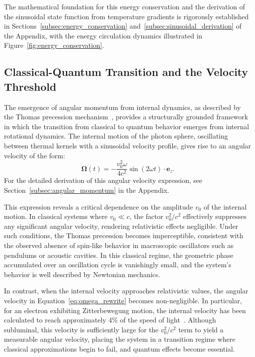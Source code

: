 \documentclass[%
 reprint,
 amsmath,amssymb,
 aps,
]{revtex4-1}
\numberwithin{equation}{section}%
\begin{document}
The mathematical foundation for this energy conservation and the derivation of the sinusoidal state function from temperature gradients is rigorously established in Sections~\ref{subsec:energy_conservation} and~\ref{subsec:sinusoidal_derivation} of the Appendix, with the energy circulation dynamics illustrated in Figure~\ref{fig:energy_conservation}.


\subsection{Classical-Quantum Transition and the Velocity Threshold} \label{subsec:velocity_threshold}

The emergence of angular momentum from internal dynamics, as described by the Thomas precession mechanism~\cite{hanamura2309.0047,hanamura2501.0130}, provides a structurally grounded framework in which the transition from classical to quantum behavior emerges from internal rotational dynamics. The internal motion of the photon sphere, oscillating between thermal kernels with a sinusoidal velocity profile, gives rise to an angular velocity of the form:
\begin{equation}
\boldsymbol{\Omega}(t) = -\frac{v_0^2 \omega}{4c^2} \sin(2\omega t) \cdot \boldsymbol{e}_z. \label{eq:omega_rewrite}
\end{equation}
For the detailed derivation of this angular velocity expression, see Section~\ref{subsec:angular_momentum} in the Appendix.

This expression reveals a critical dependence on the amplitude \( v_0 \) of the internal motion. In classical systems where \( v_0 \ll c \), the factor \( v_0^2/c^2 \) effectively suppresses any significant angular velocity, rendering relativistic effects negligible. Under such conditions, the Thomas precession becomes imperceptible, consistent with the observed absence of spin-like behavior in macroscopic oscillators such as pendulums or acoustic cavities. In this classical regime, the geometric phase accumulated over an oscillation cycle is vanishingly small, and the system's behavior is well described by Newtonian mechanics.

In contrast, when the internal velocity approaches relativistic values, the angular velocity in Equation~\eqref{eq:omega_rewrite} becomes non-negligible. In particular, for an electron exhibiting Zitterbewegung motion, the internal velocity has been calculated to reach approximately 4\% of the speed of light~\cite{hanamura2501.0130}. Although subluminal, this velocity is sufficiently large for the \( v_0^2/c^2 \) term to yield a measurable angular velocity, placing the system in a transition regime where classical approximations begin to fail, and quantum effects become essential.
\end{document}
